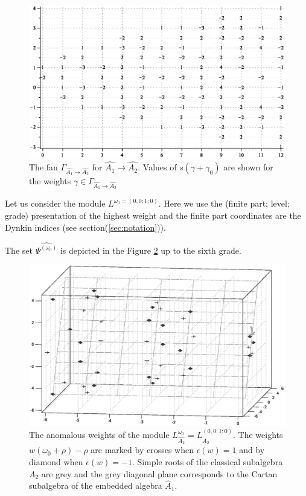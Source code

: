 \documentclass[12pt]{iopart}
\theoremstyle{definition}
\begin{document}
\begin{figure}[h!bt]
  \centering
  \includegraphics[width=135mm]{figure6.eps}

  \caption{The fan $\Gamma_{\hat{A_1}\longrightarrow \hat{A_2}}$ for $\hat{A_1}\longrightarrow \hat{A_2}$. Values of  $s(\gamma+\gamma_0)$ are shown for the weights $\gamma\in \Gamma_{\hat{A_1}\longrightarrow \hat{A_2}}$}
  \label{fig:AffineA2A1Fan}
\end{figure}

Let us consider the module $L^{\omega_0=(0,0;1;0)}$. Here we use the (finite part; level; grade)
presentation of the highest weight and the finite part
coordinates are the Dynkin indices (see section(\ref{sec:notation})).

The set $\widehat{\Psi^{(\omega_0)}}$  is depicted in the Figure
\ref{fig:affine_A2_anom_point} up to the sixth grade.

\begin{figure}[h!tb]
  \includegraphics[width=140mm]{figure7.eps}
  \caption{The anomalous weights of the module $L_{\hat{A_2}}^{\omega_0}=L^{(0,0;1;0)}_{\hat{A_2}}$. The weights $w (\omega_0+\rho)-\rho$ are marked by crosses when $\epsilon(w)=1$ and
by diamond when $\epsilon(w)=-1$. Simple roots of the classical subalgebra $A_2$ are
grey and the grey diagonal plane corresponds to the Cartan subalgebra of
the embedded algebra $\hat{A}_1$.}
  \label{fig:affine_A2_anom_point}
\end{figure}
\end{document}
